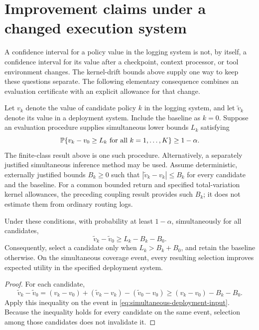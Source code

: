 \section{Improvement claims under a changed execution system}
\label{sec:deployment-certificate}

A confidence interval for a policy value in the logging system is not, by itself, a confidence interval for its value after a checkpoint, context processor, or tool environment changes. The kernel-drift bounds above supply one way to keep these questions separate. The following elementary consequence combines an evaluation certificate with an explicit allowance for that change.

Let $v_k$ denote the value of candidate policy $k$ in the logging system, and let $\widetilde v_k$ denote its value in a deployment system. Include the baseline as $k=0$. Suppose an evaluation procedure supplies simultaneous lower bounds $L_k$ satisfying
\begin{equation}
 \P\{v_k-v_0\ge L_k\text{ for all }k=1,\ldots,K\}\ge1-\alpha.
 \label{eq:simultaneous-deployment-input}
\end{equation}
The finite-class result above is one such procedure. Alternatively, a separately justified simultaneous inference method may be used. Assume deterministic, externally justified bounds $B_k\ge0$ such that
$|\widetilde v_k-v_k|\le B_k$ for every candidate and the baseline. For a common bounded return and specified total-variation kernel allowances, the preceding coupling result provides such $B_k$; it does not estimate them from ordinary routing logs.

\begin{corollary}
\label{cor:deployment}
Under these conditions, with probability at least $1-\alpha$, simultaneously for all candidates,
\begin{equation}
 \widetilde v_k-\widetilde v_0\ge L_k-B_k-B_0.
 \label{eq:deployment-certificate}
\end{equation}
Consequently, select a candidate only when $L_k>B_k+B_0$, and retain the baseline otherwise. On the simultaneous coverage event, every resulting selection improves expected utility in the specified deployment system.
\end{corollary}
\begin{proof}
For each candidate,
\[
 \widetilde v_k-\widetilde v_0
 =(v_k-v_0)+(\widetilde v_k-v_k)-(\widetilde v_0-v_0)
 \ge(v_k-v_0)-B_k-B_0.
\]
Apply this inequality on the event in \eqref{eq:simultaneous-deployment-input}. Because the inequality holds for every candidate on the same event, selection among those candidates does not invalidate it.
\end{proof}

